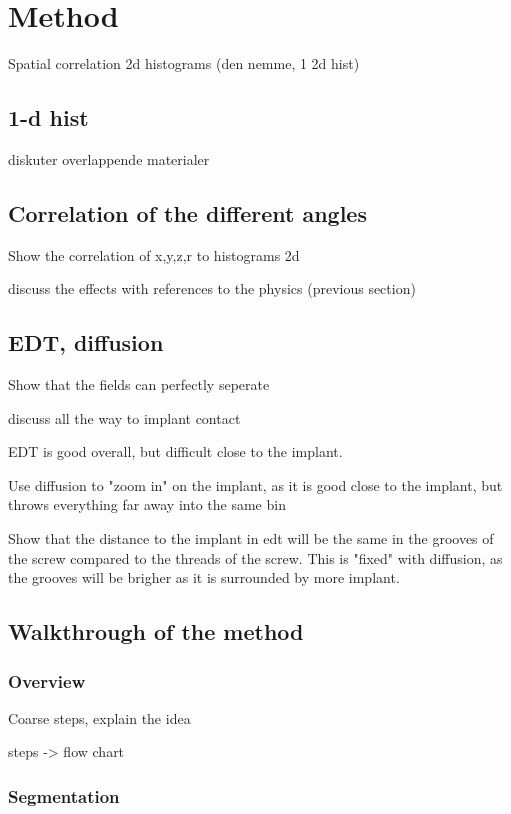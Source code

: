 \section{Method}
Spatial correlation 2d histograms (den nemme, 1 2d hist)

\subsection{1-d hist}
diskuter overlappende materialer

\subsection{Correlation of the different angles}
Show the correlation of x,y,z,r to histograms 2d

discuss the effects with references to the physics (previous section)

\subsection{EDT, diffusion}
Show that the fields can perfectly seperate

discuss all the way to implant contact

EDT is good overall, but difficult close to the implant. 

Use diffusion to "zoom in" on the implant, as it is good close to the implant, but throws everything far away into the same bin

Show that the distance to the implant in edt will be the same in the grooves of the screw compared to the threads of the screw. This is "fixed" with diffusion, as the grooves will be brigher as it is surrounded by more implant.

\subsection{Walkthrough of the method}

\subsubsection{Overview}
Coarse steps, explain the idea

steps -> flow chart

\subsubsection{Segmentation}

